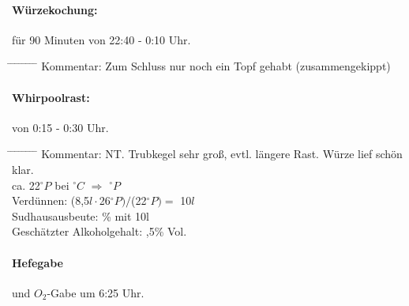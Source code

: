\documentclass[12pt,oneside,a4paper]{scrartcl}
\begin{document}
{\paragraph{Würzekochung:} für 90 Minuten von 22:40 - 0:10 Uhr.
	\begin{tabbing}
		\hspace{1cm} \= \hspace{1cm} \= \hspace{1cm} \= \hspace{1cm} \= \hspace{1cm} \= \hspace{1cm} \= \hspace{1cm} \= \hspace{1cm} \= \kill
		\> Kommentar: \> \> \> Zum Schluss nur noch ein Topf gehabt (zusammengekippt)
	\end{tabbing}
%
\paragraph{Whirpoolrast:} von 0:15 - 0:30 Uhr.
	\begin{tabbing}
		\hspace{1cm} \= \hspace{1cm} \= \hspace{1cm} \= \hspace{1cm} \= \hspace{1cm} \= \hspace{1cm} \= \hspace{1cm} \= \hspace{1cm} \= \kill
		\> Kommentar: \>\>\> NT. Trubkegel sehr groß, evtl. längere Rast. Würze lief schön klar. \\
		\> \> \> ca. 22$^\circ P$ \> \> bei $^\circ C$ \> $\Rightarrow$ $^\circ P$\\
		\> \> Verdünnen: \> \> \> \> \> (8,5$l \cdot$26$ ^\circ P)/$(22$^\circ P)=$ 10$l$\\
		\> \> Sudhausausbeute: \> \> \> \> \% mit 10l\\
		\> \> Geschätzter Alkoholgehalt: \> \> \> \> ,5\% Vol.
	\end{tabbing}
%
\paragraph{Hefegabe} und $O_2$-Gabe um 6:25 Uhr.
%
}
\end{document}
